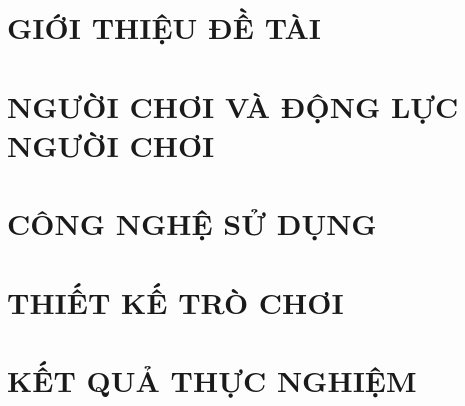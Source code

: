 \documentclass[a4paper,13pt,3p,twoside]{report}
\theoremstyle{definition}
\begin{document}
\glsaddall 
 \renewcommand*{\glossaryname}{DANH MỤC THUẬT NGỮ VÀ TỪ VIẾT TẮT}
\renewcommand*{\entryname}{Thuật ngữ}
\renewcommand*{\descriptionname}{Ý nghĩa}
\printnoidxglossaries


% 


\newpage
{}

\pagestyle{fancy}
\fancyhf{}
\fancyhead[RE, LO]{\leftmark}
\fancyfoot[RE, LO]{\thepage}

\chapter{GIỚI THIỆU ĐỀ TÀI}
\label{chapter:Introduction}

\newpage
\chapter{NGƯỜI CHƠI VÀ ĐỘNG LỰC NGƯỜI CHƠI}
\label{chapter:Related_works}



\newpage
\chapter{CÔNG NGHỆ SỬ DỤNG}
\label{chapter:Methodology}



\newpage
\chapter{THIẾT KẾ TRÒ CHƠI}
\label{chapter:GameDesign}


\newpage
% 

\newpage
\chapter{KẾT QUẢ THỰC NGHIỆM}
\label{chapter:Experiment}

\end{document}

